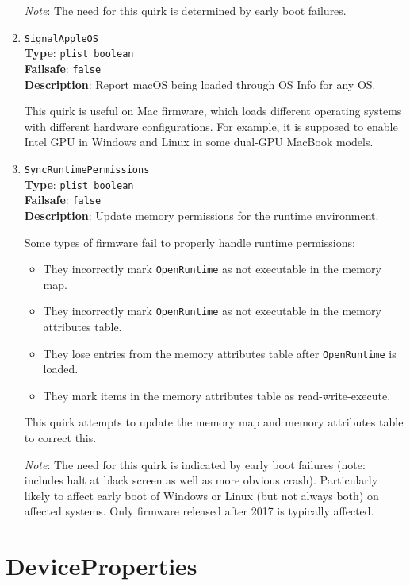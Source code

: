 \documentclass[]{article}
\makeatletter
\providecommand{\tightlist}{%
  \setlength{\itemsep}{0pt}\setlength{\parskip}{0pt}}
\renewcommand{\label}[1]{%
\zref@wrapper@immediate{\oldlabel{#1}}}  %
\makeatother
\begin{document}
\begin{enumerate}
  \emph{Note}: The need for this quirk is determined by early boot failures.

\item
  \texttt{SignalAppleOS}\\
  \textbf{Type}: \texttt{plist\ boolean}\\
  \textbf{Failsafe}: \texttt{false}\\
  \textbf{Description}: Report macOS being loaded through OS Info for any OS.

  This quirk is useful on Mac firmware, which loads different operating systems
  with different hardware configurations. For example, it is supposed to enable
  Intel GPU in Windows and Linux in some dual-GPU MacBook models.

\item
  \texttt{SyncRuntimePermissions}\\
  \textbf{Type}: \texttt{plist\ boolean}\\
  \textbf{Failsafe}: \texttt{false}\\
  \textbf{Description}: Update memory permissions for the runtime environment.

  Some types of firmware fail to properly handle runtime permissions:
  \begin{itemize}
    \tightlist
    \item They incorrectly mark \texttt{OpenRuntime} as not executable in the memory map.
    \item They incorrectly mark \texttt{OpenRuntime} as not executable in the memory
    attributes table.
    \item They lose entries from the memory attributes table after \texttt{OpenRuntime}
    is loaded.
    \item They mark items in the memory attributes table as read-write-execute.
  \end{itemize}

  This quirk attempts to update the memory map and memory attributes table to correct this.

  \emph{Note}: The need for this quirk is indicated by early boot failures (note: includes halt at black
  screen as well as more obvious crash). Particularly likely to affect early boot of Windows or Linux (but
  not always both) on affected systems. Only firmware released after 2017 is typically affected.

\end{enumerate}

\section{DeviceProperties}\label{devprops}
\end{document}
